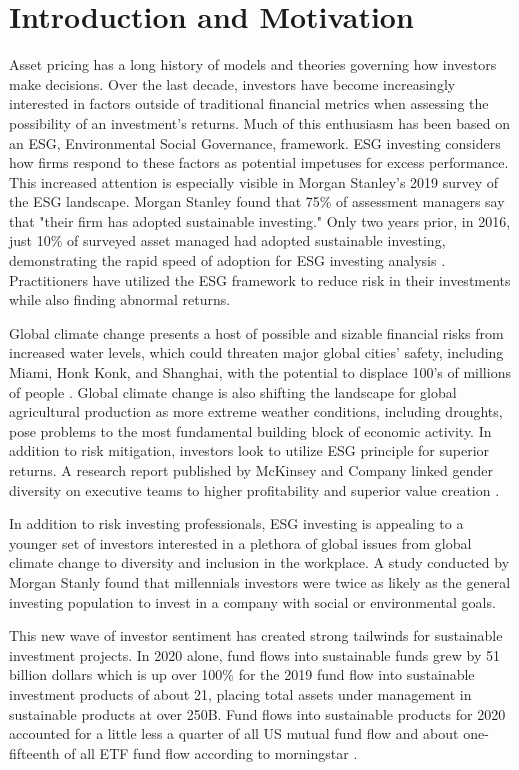 \documentclass[12pt,oneside,reqno]{amsart}
\begin{document}
\section{Introduction and Motivation}
Asset pricing has a long history of models and theories governing how investors make decisions. Over the last decade, investors have become increasingly interested in factors outside of traditional financial metrics when assessing the possibility of an investment's returns. Much of this enthusiasm has been based on an ESG, Environmental Social Governance, framework. ESG investing considers how firms respond to these factors as potential impetuses for excess performance. This increased attention is especially visible in Morgan Stanley's 2019 survey of the ESG landscape. Morgan Stanley  found that 75\% of assessment managers say that "their firm has adopted sustainable investing." Only two years prior, in 2016, just 10\% of surveyed asset managed had adopted sustainable investing, demonstrating the rapid speed of adoption for ESG investing analysis \cite{morgan_stanley_sustainable_2019}. Practitioners have utilized the ESG framework to reduce risk in their investments while also finding abnormal returns.

Global climate change presents a host of possible and sizable financial risks from increased water levels, which could threaten major global cities' safety, including Miami, Honk Konk, and Shanghai, with the potential to displace 100's of millions of people \cite{holder_three-degree_nodate}. Global climate change is also shifting the landscape for global agricultural production as more extreme weather conditions, including droughts, pose problems to the most fundamental building block of economic activity. In addition to risk mitigation, investors look to utilize ESG principle for superior returns. A research report published by McKinsey and Company linked gender diversity on executive teams to higher profitability and superior value creation \cite{mckinsey_diversity}.

In addition to risk investing professionals, ESG investing is appealing to a younger set of investors interested in a plethora of global issues from global climate change to diversity and inclusion in the workplace. A study conducted by Morgan Stanly found that millennials investors were twice as likely as the general investing population to invest in a company with social or environmental goals.

This new wave of investor sentiment has created strong tailwinds for sustainable investment projects. In 2020 alone, fund flows into sustainable funds grew by 51 billion dollars which is up over 100\% for the 2019 fund flow into sustainable investment products of about 21, placing total assets under management in sustainable products at over 250B. Fund flows into sustainable products for 2020 accounted for a little less a quarter of all US mutual fund flow and about one-fifteenth of all ETF fund flow according to morningstar \cite{monring_star_ESG}.
\end{document}
